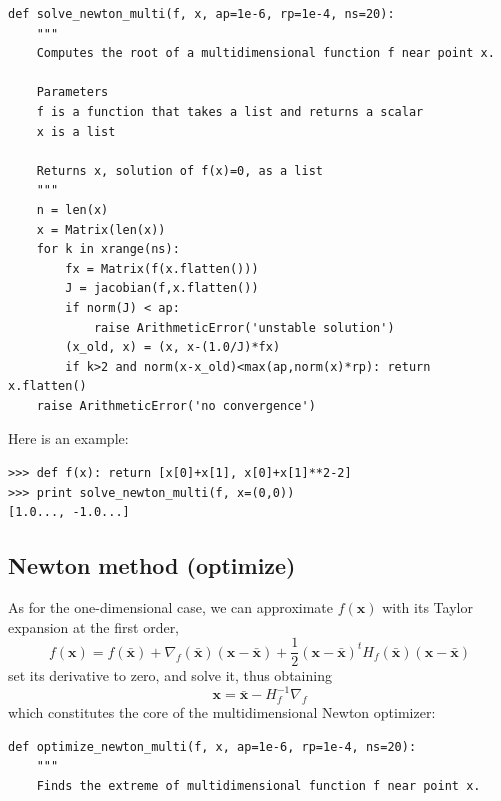 \documentclass[justified,sixbynine]{tufte-book}
\def\ft{\small\tt}
\theoremstyle{plain}%
\theoremstyle{definition}
\theoremstyle{remark}
\begin{document}
\begin{fullwidth}
\begin{lstlisting}[caption={in file: {\ft nlib.py}}]
def solve_newton_multi(f, x, ap=1e-6, rp=1e-4, ns=20):
    """
    Computes the root of a multidimensional function f near point x.

    Parameters
    f is a function that takes a list and returns a scalar
    x is a list

    Returns x, solution of f(x)=0, as a list
    """
    n = len(x)
    x = Matrix(len(x))
    for k in xrange(ns):
        fx = Matrix(f(x.flatten()))
        J = jacobian(f,x.flatten())
        if norm(J) < ap:
            raise ArithmeticError('unstable solution')
        (x_old, x) = (x, x-(1.0/J)*fx)
        if k>2 and norm(x-x_old)<max(ap,norm(x)*rp): return x.flatten()
    raise ArithmeticError('no convergence')
\end{lstlisting}

Here is an example:

\begin{lstlisting}[caption={in file: {\ft nlib.py}}]
>>> def f(x): return [x[0]+x[1], x[0]+x[1]**2-2]
>>> print solve_newton_multi(f, x=(0,0))
[1.0..., -1.0...]
\end{lstlisting}

\goodbreak\subsection{Newton method (optimize)}


As for the one-dimensional case, we can approximate $f(\mathbf{x})$ with its Taylor expansion at the first order,
\begin{equation}
f(\mathbf{x}) = f(\mathbf{\bar x}) + \nabla_f(\mathbf{\bar x})(\mathbf{x}-\mathbf{\bar x}) +
\frac12 (\mathbf{x}-\mathbf{\bar x})^t H_f(\mathbf{\bar x})(\mathbf{x}-\mathbf{\bar x})
\end{equation}
set its derivative to zero, and solve it, thus obtaining
\begin{equation}
\mathbf{x} = \mathbf{\bar x} - H^{-1}_f \nabla_f
\end{equation}
which constitutes the core of the multidimensional Newton optimizer:

\begin{lstlisting}[caption={in file: {\ft nlib.py}}]
def optimize_newton_multi(f, x, ap=1e-6, rp=1e-4, ns=20):
    """
    Finds the extreme of multidimensional function f near point x.


\end{lstlisting}
\end{fullwidth}
\end{document}
